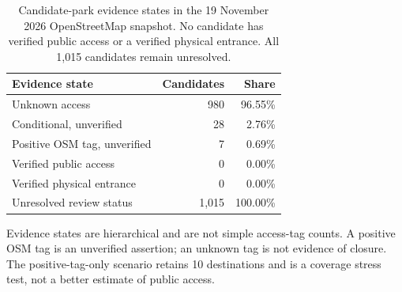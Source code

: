 \begin{table}[htbp]
\centering
\small
\caption{Candidate-park evidence states in the 19 November 2026 OpenStreetMap
snapshot. No candidate has verified public access or a verified physical
entrance. All 1,015 candidates remain unresolved.}
\label{tab:park}
\begin{threeparttable}
\begin{tabular}{@{}lrr@{}}
\toprule
Evidence state & Candidates & Share \\
\midrule
Unknown access & 980 & 96.55\% \\
Conditional, unverified & 28 & 2.76\% \\
Positive OSM tag, unverified & 7 & 0.69\% \\
Verified public access & 0 & 0.00\% \\
Verified physical entrance & 0 & 0.00\% \\
Unresolved review status & 1,015 & 100.00\% \\
\bottomrule
\end{tabular}
\begin{tablenotes}[flushleft]\footnotesize
\item Evidence states are hierarchical and are not simple access-tag counts. A positive OSM tag is an unverified assertion; an unknown tag is not evidence of closure. The positive-tag-only scenario retains 10 destinations and is a coverage stress test, not a better estimate of public access.
\end{tablenotes}
\end{threeparttable}
\end{table}
